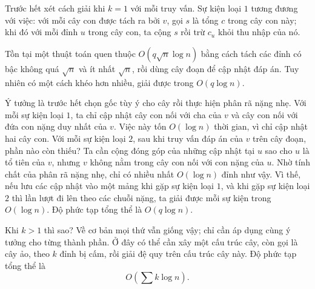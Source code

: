 \documentclass[11pt]{article}
\begin{document}
Trước hết xét cách giải khi $k=1$ với mỗi truy vấn. Sự kiện loại $1$ tương
đương với việc: với mỗi cây con được tách ra bởi $v$, gọi $s$ là tổng $c$
trong cây con này; khi đó với mỗi đỉnh $u$ trong cây con, ta cộng $s$ rồi
trừ $c_u$ khỏi thu nhập của nó.

Tồn tại một thuật toán quen thuộc $O(q\sqrt n\log n)$ bằng cách tách các đỉnh
có bậc không quá $\sqrt n$ và ít nhất $\sqrt n$, rồi dùng cây đoạn để cập
nhật đáp án. Tuy nhiên có một cách khéo hơn nhiều, giải được trong
$O(q\log n)$.

Ý tưởng là trước hết chọn gốc tùy ý cho cây rồi thực hiện phân rã nặng nhẹ.
Với mỗi sự kiện loại $1$, ta chỉ cập nhật cây con nối với cha của $v$ và cây
con nối với đứa con nặng duy nhất của $v$. Việc này tốn $O(\log n)$ thời
gian, vì chỉ cập nhật hai cây con. Với mỗi sự kiện loại $2$, sau khi truy vấn
đáp án của $v$ trên cây đoạn, phần nào còn thiếu? Ta cần cộng đóng góp của
những cập nhật tại $u$ sao cho $u$ là tổ tiên của $v$, nhưng $v$ không nằm
trong cây con nối với con nặng của $u$. Nhờ tính chất của phân rã nặng nhẹ,
chỉ có nhiều nhất $O(\log n)$ đỉnh như vậy. Vì thế, nếu lưu các cập nhật vào
một mảng khi gặp sự kiện loại $1$, và khi gặp sự kiện loại $2$ thì lần lượt
đi lên theo các chuỗi nặng, ta giải được mỗi sự kiện trong $O(\log n)$. Độ
phức tạp tổng thể là $O(q\log n)$.

Khi $k>1$ thì sao? Về cơ bản mọi thứ vẫn giống vậy; chỉ cần áp dụng cùng ý
tưởng cho từng thành phần. Ở đây có thể cần xây một cấu trúc cây, còn gọi là
cây ảo, theo $k$ đỉnh bị cấm, rồi giải đệ quy trên cấu trúc cây này. Độ phức
tạp tổng thể là
\[
  O\left(\sum k\log n\right).
\]
\end{document}
